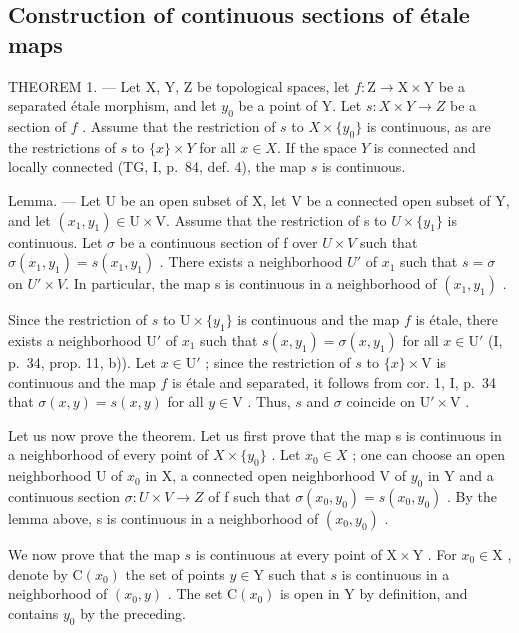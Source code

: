 \subsection{Construction of continuous sections of étale maps}

THEOREM 1. --- Let X, Y, Z be topological spaces, let \(f: \mathrm{Z} \to \mathrm{X} \times \mathrm{Y}\) be a separated étale morphism, and let \(y_0\) be a point of Y. Let \(s: X \times Y \to Z\) be a section of \(f\) . Assume that the restriction of \(s\) to \(X \times \{y_0\}\) is continuous, as are the restrictions of \(s\) to \(\{x\} \times Y\) for all \(x \in X\). If the space \(Y\) is connected and locally connected (TG, I, p.~84, def. 4), the map \(s\) is continuous.

Lemma. --- Let U be an open subset of X, let V be a connected open subset of Y, and let \((x_{1},y_{1})\in\mathrm{U}\times\mathrm{V}\). Assume that the restriction of s to \(U\times\{y_{1}\}\) is continuous. Let \(\sigma\) be a continuous section of f over \(U\times V\) such that \(\sigma(x_{1},y_{1})=s(x_{1},y_{1})\) . There exists a neighborhood \(U'\) of \(x_{1}\) such that \(s=\sigma\) on \(U'\times V\). In particular, the map s is continuous in a neighborhood of \((x_{1},y_{1})\) .

Since the restriction of \(s\) to \(\mathrm{U} \times \{y_1\}\) is continuous and the map \(f\) is étale, there exists a neighborhood \(\mathrm{U}'\) of \(x_1\) such that \(s(x, y_1) = \sigma(x, y_1)\) for all \(x \in \mathrm{U}'\) (I, p.~34, prop. 11, b)). Let \(x \in \mathrm{U}'\) ; since the restriction of \(s\) to \(\{x\} \times \mathrm{V}\) is continuous and the map \(f\) is étale and separated, it follows from cor. 1, I, p.~34 that \(\sigma(x, y) = s(x, y)\) for all \(y \in \mathrm{V}\) . Thus, \(s\) and \(\sigma\) coincide on \(\mathrm{U}' \times \mathrm{V}\) .

Let us now prove the theorem. Let us first prove that the map s is continuous in a neighborhood of every point of \(X \times \{y_{0}\}\) . Let \(x_{0} \in X\) ; one can choose an open neighborhood U of \(x_{0}\) in X, a connected open neighborhood V of \(y_{0}\) in Y and a continuous section \(\sigma: U \times V \to Z\) of f such that \(\sigma(x_{0}, y_{0}) = s(x_{0}, y_{0})\) . By the lemma above, s is continuous in a neighborhood of \((x_{0}, y_{0})\) .

We now prove that the map \(s\) is continuous at every point of \(\mathrm{X} \times \mathrm{Y}\) . For \(x_0 \in \mathrm{X}\) , denote by \(\mathrm{C}(x_0)\) the set of points \(y \in \mathrm{Y}\) such that \(s\) is continuous in a neighborhood of \((x_0, y)\) . The set \(\mathrm{C}(x_0)\) is open in Y by definition, and contains \(y_0\) by the preceding.

